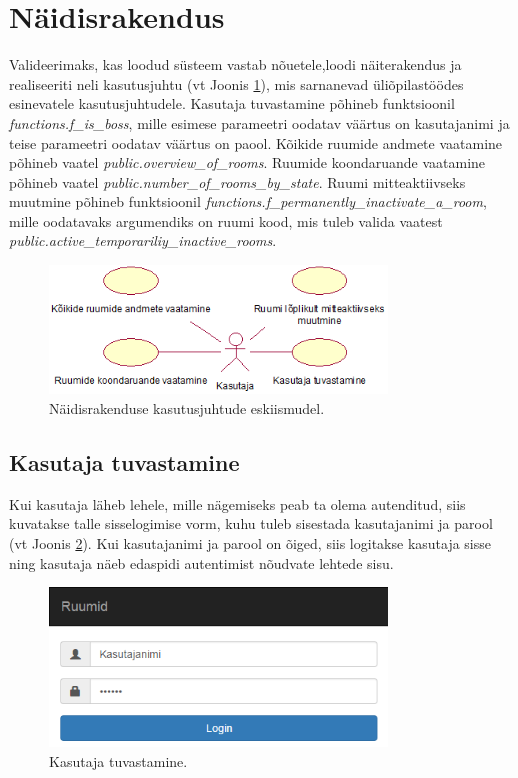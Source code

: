 \documentclass[a4paper,12pt]{article} %
\begin{document}
\section{Näidisrakendus}
Valideerimaks, kas loodud süsteem vastab nõuetele,loodi näiterakendus ja realiseeriti neli kasutusjuhtu (vt Joonis \ref{fig_näidisrakendus_kasutusjuhtude_eskiismudel}), mis sarnanevad üliõpilastöödes esinevatele kasutusjuhtudele. Kasutaja tuvastamine põhineb funktsioonil \textit{functions.f\_is\_boss}, mille esimese parameetri oodatav väärtus on kasutajanimi ja teise parameetri oodatav väärtus on paool. Kõikide ruumide andmete vaatamine põhineb vaatel \textit{public.overview\_of\_rooms}. Ruumide koondaruande vaatamine põhineb vaatel \textit{public.number\_of\_rooms\_by\_state}. Ruumi mitteaktiivseks muutmine põhineb funktsioonil \textit{functions.f\_permanently\_inactivate\_a\_room}, mille oodatavaks argumendiks on ruumi kood, mis tuleb valida vaatest \newline \textit{public.active\_temporariliy\_inactive\_rooms}.
\begin{figure}[H]
\centering
\includegraphics[width=0.8\textwidth]{./diagrams/sample-application-use-case-diagram.png}
\caption{Näidisrakenduse kasutusjuhtude eskiismudel.}
\label{fig_näidisrakendus_kasutusjuhtude_eskiismudel}
\end{figure}
\subsection{Kasutaja tuvastamine}
Kui kasutaja läheb lehele, mille nägemiseks peab ta olema autenditud, siis kuvatakse talle sisselogimise vorm, kuhu tuleb sisestada kasutajanimi ja parool (vt Joonis \ref{fig_näidisrakendus_kasutaja_tuvastamine}). Kui kasutajanimi ja parool on õiged, siis logitakse kasutaja sisse ning kasutaja näeb edaspidi autentimist nõudvate lehtede sisu.
\begin{figure}[H]
\centering
\includegraphics[width=0.8\textwidth]{./diagrams/sample-app-user-auth.png}
\caption{Kasutaja tuvastamine.}
\label{fig_näidisrakendus_kasutaja_tuvastamine}
\end{figure}
\end{document}
